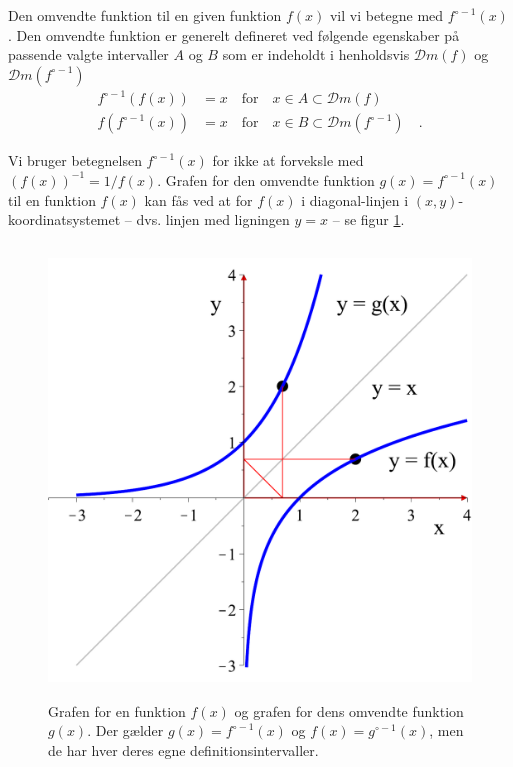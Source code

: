 \begin{definition}
Den omvendte funktion til en given funktion $f(x)$ vil vi betegne med  $f^{\circ -1}(x)$. Den omvendte funktion er generelt defineret ved følgende egenskaber på passende valg\-te intervaller $A$ og $B$ som er indeholdt i henholdsvis $\mathcal{D}m(f)$ og $\mathcal{D}m(f^{\circ -1})$
\begin{equation}
\begin{aligned}
f^{\circ -1}(f(x)) &= x \quad \textrm{for} \quad x \in A \subset \mathcal{D}m(f)\\
f(f^{\circ -1}(x)) &= x \quad \textrm{for} \quad x \in B \subset \mathcal{D}m(f^{\circ -1})\quad.
\end{aligned}
\end{equation}
\end{definition}

\begin{obs}
Vi bruger betegnelsen  $f^{\circ -1}(x)$ for ikke at forveksle med $(f(x))^{-1} = 1/f(x)$.
Grafen for den omvendte funktion $g(x) = f^{\circ -1}(x)$  til en  funktion $f(x)$ kan fås ved at  for $f(x)$ i diagonal-linjen i $(x,y)$-koordinatsystemet -- dvs. linjen med ligningen $y = x$ --  se figur \ref{tn14.figOmvendt}.
\end{obs}
\begin{figure}[h]
\centerline{\includegraphics[height=120mm]{FIGS/plotOmvendt.pdf}}
\begin{center}
\caption{Grafen for en funktion $f(x)$ og grafen for dens omvendte funktion $g(x)$. Der gælder $g(x) = f^{\circ-1}(x)$ og $f(x) = g^{\circ-1}(x)$, men de har hver deres egne definitionsintervaller.} \label{tn14.figOmvendt}
\end{center}
\end{figure}



